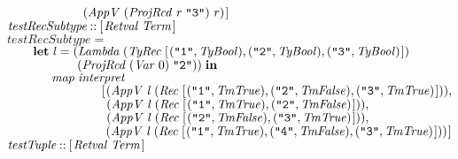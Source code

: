 \documentclass[10pt]{article}
\newcommand{\Conid}[1]{\mathit{#1}}
\newcommand{\Varid}[1]{\mathit{#1}}
\begin{document}
\begin{tabbing}
${\hskip2.00em\relax\phantom{\mathbf{let}\;\mbox{}}\phantom{\Varid{map}\;\mbox{}}\phantom{[\mskip1.5mu \mbox{}}(\Conid{AppV}\;(\Conid{ProjRcd}\;\Varid{r}\;\text{\tt \char34 3\char34})\;\Varid{r})\mskip1.5mu]}$\\
${}$\\
${\Varid{testRecSubtype}\mathbin{::}[\mskip1.5mu \Conid{Retval}\;\Conid{Term}\mskip1.5mu]}$\\
${\Varid{testRecSubtype}\mathrel{=}}$\\
${\hskip2.00em\relax\mathbf{let}\;\Varid{l}\mathrel{=}(\Conid{Lambda}\;(\Conid{TyRec}\;[\mskip1.5mu (\text{\tt \char34 1\char34},\Conid{TyBool}),(\text{\tt \char34 2\char34},\Conid{TyBool}),(\text{\tt \char34 3\char34},\Conid{TyBool})\mskip1.5mu])}$\\
${\hskip2.00em\relax\phantom{\mathbf{let}\;\Varid{l}\mathrel{=}(\mbox{}}(\Conid{ProjRcd}\;(\Conid{Var}\;\mathrm{0})\;\text{\tt \char34 2\char34}))\;\mathbf{in}}$\\
${\hskip2.00em\relax\phantom{\mathbf{let}\;\mbox{}}\Varid{map}\;\Varid{interpret}\;}$\\
${\hskip2.00em\relax\phantom{\mathbf{let}\;\mbox{}}\hskip4.00em\relax[\mskip1.5mu (\Conid{AppV}\;\Varid{l}\;(\Conid{Rec}\;[\mskip1.5mu (\text{\tt \char34 1\char34},\Conid{TmTrue}),(\text{\tt \char34 2\char34},\Conid{TmFalse}),(\text{\tt \char34 3\char34},\Conid{TmTrue})\mskip1.5mu])),}$\\
${\hskip2.00em\relax\phantom{\mathbf{let}\;\mbox{}}\hskip4.00em\relax\phantom{[\mskip1.5mu \mbox{}}(\Conid{AppV}\;\Varid{l}\;(\Conid{Rec}\;[\mskip1.5mu (\text{\tt \char34 1\char34},\Conid{TmTrue}),(\text{\tt \char34 2\char34},\Conid{TmFalse})\mskip1.5mu])),}$\\
${\hskip2.00em\relax\phantom{\mathbf{let}\;\mbox{}}\hskip4.00em\relax\phantom{[\mskip1.5mu \mbox{}}(\Conid{AppV}\;\Varid{l}\;(\Conid{Rec}\;[\mskip1.5mu (\text{\tt \char34 2\char34},\Conid{TmFalse}),(\text{\tt \char34 3\char34},\Conid{TmTrue})\mskip1.5mu])),}$\\
${\hskip2.00em\relax\phantom{\mathbf{let}\;\mbox{}}\hskip4.00em\relax\phantom{[\mskip1.5mu \mbox{}}(\Conid{AppV}\;\Varid{l}\;(\Conid{Rec}\;[\mskip1.5mu (\text{\tt \char34 1\char34},\Conid{TmTrue}),(\text{\tt \char34 4\char34},\Conid{TmFalse}),(\text{\tt \char34 3\char34},\Conid{TmTrue})\mskip1.5mu]))\mskip1.5mu]}$\\
${}$\\
${\Varid{testTuple}\mathbin{::}[\mskip1.5mu \Conid{Retval}\;\Conid{Term}\mskip1.5mu]}$\\

\end{tabbing}
\end{document}
